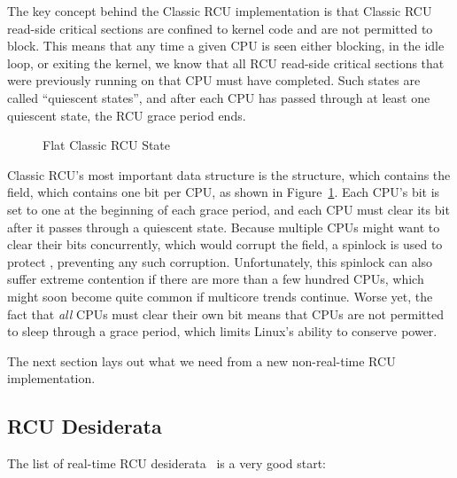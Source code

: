 The key concept behind the Classic RCU implementation is that
Classic RCU read-side critical sections are confined to kernel
code and are not permitted to block.
This means that any time a given CPU is seen
either blocking, in the idle loop, or exiting the kernel, we know that all
RCU read-side critical sections that were previously running on
that CPU must have completed.
Such states are called ``quiescent states'', and
after each CPU has passed through at least one quiescent state,
the RCU grace period ends.

\begin{figure}[htb]
\centering
{}
\caption{Flat Classic RCU State}
\label{fig:app:rcuimpl:rcutree:Flat Classic RCU State}
\end{figure}

Classic RCU's most important data structure is the 
structure, which contains the  field, which contains
one bit per CPU, as shown in
Figure~\ref{fig:app:rcuimpl:rcutree:Flat Classic RCU State}.
Each CPU's bit is set to one at the beginning of each grace period,
and each CPU must clear its bit after it passes through a quiescent
state.
Because multiple CPUs might want to clear their bits concurrently,
which would corrupt the  field, a
spinlock is used to protect , preventing any
such corruption.
Unfortunately, this spinlock can also suffer extreme contention if there
are more than a few hundred CPUs, which might soon become quite common
if multicore trends continue.
Worse yet, the fact that \emph{all} CPUs must clear their own bit means
that CPUs are not permitted to sleep through a grace period, which limits
Linux's ability to conserve power.




The next section lays out what we need from a new non-real-time
RCU implementation.

\subsection{RCU Desiderata}
\label{app:rcuimpl:rcutree:RCU Desiderata}

The list of real-time RCU desiderata~\cite{PaulMcKenney05b}
is a very good start:

